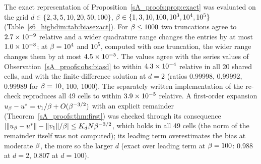 The exact representation of Proposition~\ref{sA_proofs:prop:exact} was evaluated on the grid
$d\in\{2,3,5,10,20,50,100\}$, $\beta\in\{1,3,10,100,10^3,10^4,10^5\}$
(Table~\ref{s6_highdim:tab:biasexact}).
For $\beta\le1000$ two truncations agree to $2.7\times 10^{-9}$ relative and a wider quadrature range
changes the entries by at most $1.0\times 10^{-8}$; at $\beta=10^4$ and $10^5$, computed with one
truncation, the wider range changes them by at most $4.5\times 10^{-5}$. The values agree with the
series values of Observation~\ref{sA_proofs:obs:biasd} to within $4.3\times 10^{-4}$ relative in all
20 shared cells, and with the finite-difference solution at $d=2$ (ratios 0.99998, 0.99992,
0.99989 for $\beta=10$, 100, 1000). The separately written implementation of the re-check
reproduces all 49 cells to within $3.9\times 10^{-5}$ relative.
A first-order expansion $u_{\beta}-u^{*}=v_1/\beta+O(\beta^{-3/2})$ with an explicit remainder
(Theorem~\ref{sA_proofs:thm:first}) was checked through its consequence
$\lvert \lVert u_{\beta}-u^{*}\rVert-\lVert v_1\rVert/\beta\rvert\le K_dN\beta^{-3/2}$, which holds in all 49 cells (the
norm of the remainder itself was not computed); its leading term overestimates the bias at
moderate $\beta$, the more so the larger $d$ (exact over leading term at $\beta=100$: 0.988 at $d=2$,
0.807 at $d=100$).

